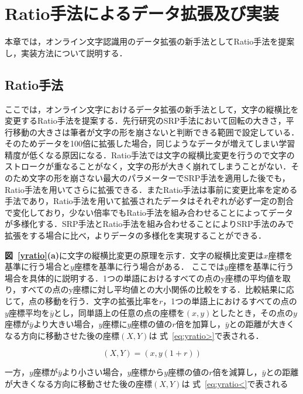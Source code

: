 
\chapter{Ratio手法によるデータ拡張及び実装}
\label{cha:propose}
本章では，オンライン文字認識用のデータ拡張の新手法としてRatio手法を提案し，実装方法について説明する．
\section{Ratio手法}
\label{ratio}
ここでは，オンライン文字におけるデータ拡張の新手法として，文字の縦横比を変更するRatio手法を提案する．先行研究\cite{takahashi}のSRP手法において回転の大きさ，平行移動の大きさは筆者が文字の形を崩さないと判断できる範囲で設定している．そのためデータを100倍に拡張した場合，同じようなデータが増えてしまい学習精度が低くなる原因になる．Ratio手法では文字の縦横比変更を行うので文字のストロークが重なることがなく，文字の形が大きく崩れてしまうことがない．そのため文字の形を崩さない最大のパラメーターでSRP手法を適用した後でも，Ratio手法を用いてさらに拡張できる．またRatio手法は事前に変更比率を定める手法であり，Ratio手法を用いて拡張されたデータはそれぞれが必ず一定の割合で変化しており，少ない倍率でもRatio手法を組み合わせることによってデータが多様化する．SRP手法とRatio手法を組み合わせることによりSRP手法のみで拡張をする場合に比べ，よりデータの多様化を実現することができる．

\textbf{図~\ref{yratio}(a)}に文字の縦横比変更の原理を示す．文字の縦横比変更は$x$座標を基準に行う場合と$y$座標を基準に行う場合がある．
ここでは$y$座標を基準に行う場合を具体的に説明する．1つの単語におけるすべての点のy座標の平均値を取り，すべての点のy座標に対し平均値との大小関係の比較をする．比較結果に応じて，点の移動を行う．文字の拡張比率を$r$，1つの単語上におけるすべての点の$y$座標平均を$\bar{y}$とし，同単語上の任意の点の座標を$(x, y)$としたとき，その点の$y$座標が$\bar{y}$より大きい場合，$y$座標に$y$座標の値の$r$倍を加算し，$\bar{y}$との距離が大きくなる方向に移動させた後の座標$(X, Y)$は 式~\ref{eq:yratio>}で表される．

\begin{equation}
  (X, Y) = (x, y(1+r))
  \label{eq:yratio>}
\end{equation}

一方，$y$座標が$\bar{y}$より小さい場合，$y$座標から$y$座標の値の$r$倍を減算し，$\bar{y}$との距離が大きくなる方向に移動させた後の座標$(X, Y)$は 式~\ref{eq:yratio<}で表される

